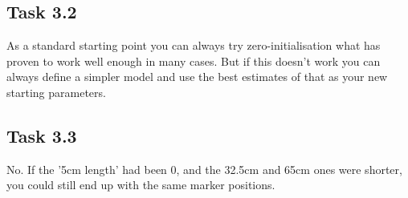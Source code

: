 \documentclass[a4paper]{article} %
\begin{document}
    \subsection*{Task 3.2}
    As a standard starting point you can always try zero-initialisation what has proven to work well enough in many cases.
    But if this doesn't work you can always define a simpler model and use the best estimates of that as your new starting parameters.

    \subsection*{Task 3.3}
    No. If the '5cm length' had been 0, and the 32.5cm and 65cm ones were shorter, you could still end up with the same marker positions.
\end{document}
